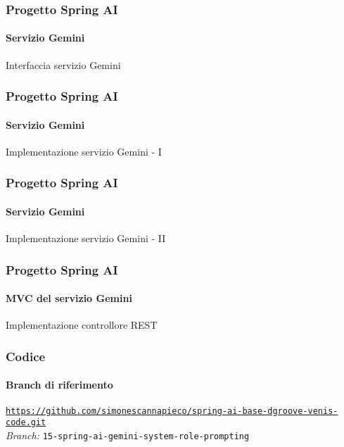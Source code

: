 %
\begin{frame}[t,fragile] \frametitle{Progetto Spring AI}
    \framesubtitle{Servizio Gemini}
        \begin{block}{Interfaccia servizio Gemini}
{\tiny}
    \end{block}
\end{frame}
%
\begin{frame}[t,fragile] \frametitle{Progetto Spring AI}
    \framesubtitle{Servizio Gemini}
		\vspace*{-.7cm}
        \begin{block}{Implementazione servizio Gemini - I}
            {\tiny}
    \end{block}
\end{frame}
%
\begin{frame}[t,fragile] \frametitle{Progetto Spring AI}
    \framesubtitle{Servizio Gemini}
        \vspace*{-.7cm}
        \begin{block}{Implementazione servizio Gemini - II}
            {\tiny}
    \end{block}
\end{frame}
%
\begin{frame}[t,fragile] \frametitle{Progetto Spring AI}
    \framesubtitle{MVC del servizio Gemini}
    	\vspace*{-.7cm}
        \begin{block}{Implementazione controllore REST}
			{\tiny}
    	\end{block}
\end{frame}
%
\begin{frame}[fragile] \frametitle{Codice}
    \framesubtitle{Branch di riferimento}
	\begin{center}
		{\scriptsize \href{https://github.com/simonescannapieco/spring-ai-base-dgroove-venis-code.git}{\texttt{https://github.com/simonescannapieco/spring-ai-base-dgroove-venis-code.git}}}\\
		\textit{Branch:} \alert{\texttt{15-spring-ai-gemini-system-role-prompting}}
	\end{center}
\end{frame}